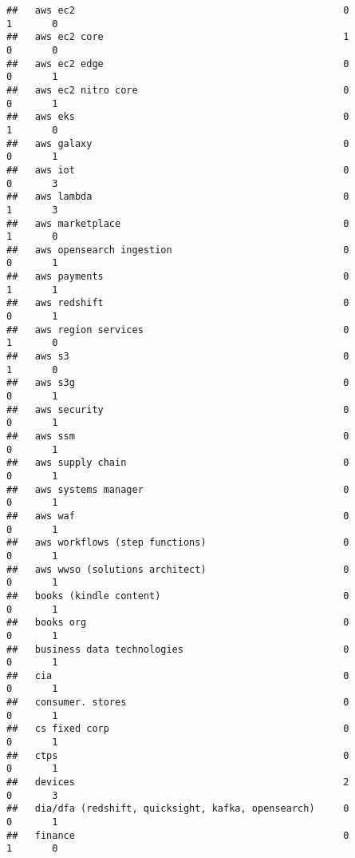 \documentclass[
]{article}
\begin{document}
\begin{verbatim}
##   aws ec2                                               0             1       0
##   aws ec2 core                                          1             0       0
##   aws ec2 edge                                          0             0       1
##   aws ec2 nitro core                                    0             0       1
##   aws eks                                               0             1       0
##   aws galaxy                                            0             0       1
##   aws iot                                               0             0       3
##   aws lambda                                            0             1       3
##   aws marketplace                                       0             1       0
##   aws opensearch ingestion                              0             0       1
##   aws payments                                          0             1       1
##   aws redshift                                          0             0       1
##   aws region services                                   0             1       0
##   aws s3                                                0             1       0
##   aws s3g                                               0             0       1
##   aws security                                          0             0       1
##   aws ssm                                               0             0       1
##   aws supply chain                                      0             0       1
##   aws systems manager                                   0             0       1
##   aws waf                                               0             0       1
##   aws workflows (step functions)                        0             0       1
##   aws wwso (solutions architect)                        0             0       1
##   books (kindle content)                                0             0       1
##   books org                                             0             0       1
##   business data technologies                            0             0       1
##   cia                                                   0             0       1
##   consumer. stores                                      0             0       1
##   cs fixed corp                                         0             0       1
##   ctps                                                  0             0       1
##   devices                                               2             0       3
##   dia/dfa (redshift, quicksight, kafka, opensearch)     0             0       1
##   finance                                               0             1       0

\end{verbatim}
\end{document}
